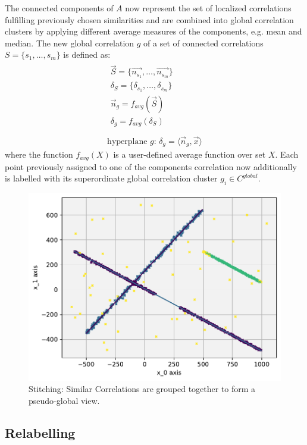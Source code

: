 The connected components of $A$ now represent the set of localized correlations fulfilling previously chosen similarities and are combined into global correlation clusters by applying different average measures of the components, e.g. mean and median. The new global correlation $g$ of a set of connected correlations $S=\{s_1,\dotsc, s_m\}$ is defined as:
\begin{gather}
    \begin{split}
        \vec{S} = \{\vec{n_{s_1}},\dotsc,\vec{n_{s_m}}\}\\
        \delta_S = \{\delta_{s_1},\dotsc,\delta_{s_m}\}\\
        \vec{n}_g = f_{avg}(\vec{S})\\
        \delta_g = f_{avg}(\delta_S)
    \end{split}\\
    \nonumber\\
    \text{hyperplane $g$: } \delta_g = \langle \vec{n}_g, \vec{x}\rangle
\end{gather}
where the function $f_{avg}(X)$ is a user-defined average function over set $X$. Each point previously assigned to one of the components correlation now additionally is labelled with its superordinate global correlation cluster $g_i \in C^{global}$.

\begin{figure}[h]
    \centering
    \includegraphics[width=.7\textwidth]{figure_method_grid/StitchedLinearCorrelationsWithColoredCorrs.pdf}
    \caption{Stitching: Similar Correlations are grouped together to form a pseudo-global view.}
    \label{fig:stitchedcorr}
\end{figure}

\subsection{Relabelling}

